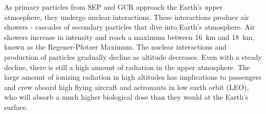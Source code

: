 As primary particles from SEP and GCR approach the Earth's upper atmosphere, they undergo nuclear interactions.  These interactions produce air showers - cascades of secondary particles that dive into Earth's atmosphere.
Air showers increase in intensity and reach a maximum between \SI{16}{\km} and \SI{18}{\km}, known as the Regener-Pfotzer Maximum\cite{regener}. The nuclear interactions and production of particles gradually decline as altitude decreases.  Even with a steady decline, there is still a high amount of radiation in the upper atmosphere.
%
%
The large amount of ionizing radiation in high altitudes has implications to passengers and crew aboard high flying aircraft and astronauts in low earth orbit (LEO), who will absorb a much higher biological dose than they would at the Earth's surface. 


